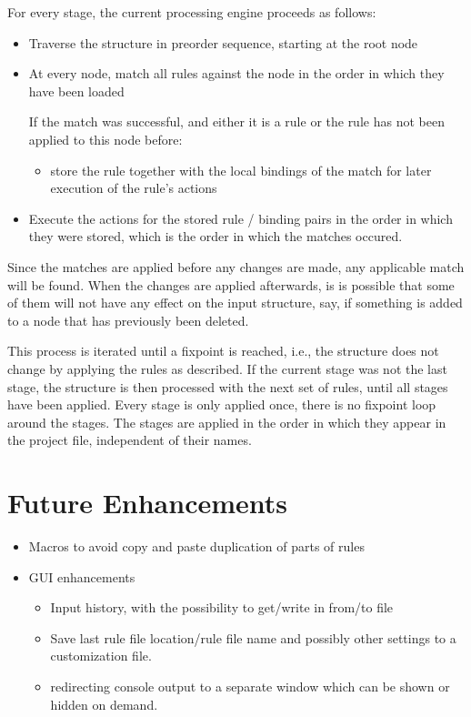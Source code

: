 \documentclass[11pt,a4paper]{report}
\begin{document}
For every stage, the current processing engine proceeds as follows:
\begin{itemize}
\item Traverse the structure in preorder sequence, starting at the root node
\item At every node, match all rules against the node in the order in which
  they have been loaded

  \noindent{}If the match was successful, and either it is a \tok{=>} rule or
  the rule has not been applied to this node before:\\[-3.4ex]
  \begin{itemize}
  \item[] store the rule together with the
    local bindings of the match for later execution of the rule's actions
  \end{itemize}
\item Execute the actions for the stored rule / binding pairs in the order in
  which they were stored, which is the order in which the matches occured.
\end{itemize}

Since the matches are applied before any changes are made, any applicable match
will be found. When the changes are applied afterwards, is is possible that
some of them will not have any effect on the input structure, say, if something
is added to a node that has previously been deleted.

This process is iterated until a fixpoint is reached, i.e., the structure does
not change by applying the rules as described. If the current stage was not the
last stage, the structure is then processed with the next set of rules, until
all stages have been applied. Every stage is only applied once, there is no
fixpoint loop around the stages. The stages are applied in the order in which
they appear in the project file, independent of their names.

\chapter{Future Enhancements}
\begin{itemize}
\item Macros to avoid copy and paste duplication of parts of rules
\item GUI enhancements
  \begin{itemize}
  \item Input history, with the possibility to get/write in from/to file
  \item Save last rule file location/rule file name and possibly other settings
    to a customization file.
  \item redirecting console output to a separate window which can be shown or
    hidden on demand.
  \end{itemize}
\end{itemize}
\fi
\end{document}
